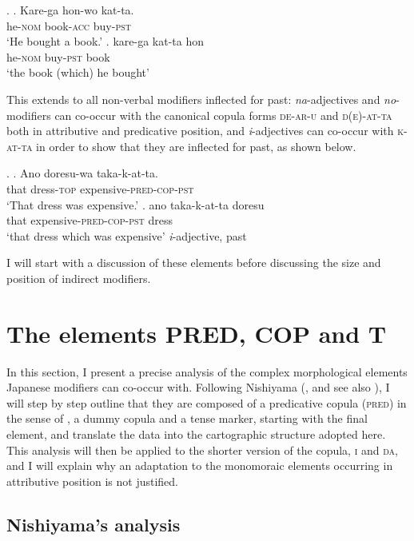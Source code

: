 \ex. \label{verbal rc, chapter 5} \ag. Kare-ga hon-wo kat-ta.\\
he-\textsc{nom} book-\textsc{acc} buy-\textsc{pst}\\
`He bought a book.’
\bg. kare-ga kat-ta hon\\
he-\textsc{nom} buy-\textsc{pst} book\\
`the book (which) he bought'

This extends to all non-verbal modifiers inflected for past: \textit{na}-adjectives and \textit{no}-modifiers can co-occur with the canonical copula forms \textsc{de-ar-u} and \textsc{d(e)-at-ta} both in attributive and predicative position, and \textit{i}-adjectives can co-occur with \textsc{k-at-ta} in order to show that they are inflected for past, as shown below.

\ex. \ag. Ano doresu-wa taka-k-at-ta.\\
that dress-\textsc{top} expensive-\textsc{pred-cop-pst}\\
`That dress was expensive.'
\bg. ano taka-k-at-ta doresu\\
that expensive-\textsc{pred-cop-pst} dress\\
`that dress which was expensive' \null \hfill \textit{i}-adjective, past

I will start with a discussion of these elements before discussing the size and position of indirect modifiers.

\section{The elements PRED, COP and T} \label{copulaelements}

In this section, I present a precise analysis of the complex morphological elements Japanese modifiers can co-occur with. Following Nishiyama (\citealt{nishiyama:1999:adj}, and see also \citealt{miyama:2011:da, watanabe:2013:non, yamada:2023:looking}), I will step by step outline that they are composed of a predicative copula (\textsc{pred}) in the sense of \citet{bowers:1993:predication}, a dummy copula and a tense marker, starting with the final element, and translate the data into the cartographic structure adopted here. This analysis will then be applied to the shorter version of the copula, \textsc{i} and \textsc{da}, and I will explain why an adaptation to the monomoraic elements occurring in attributive position is not justified.

\subsection{Nishiyama's analysis}

